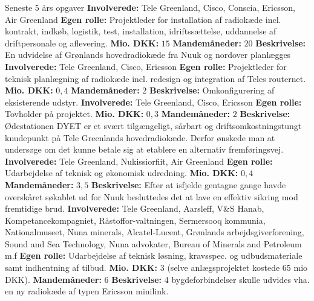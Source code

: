 \begin{rubric}{Seneste 5 års opgaver}
\entry* \textbf{Involverede:} Tele Greenland, Cisco, Conscia, Ericsson, Air Greenland
\entry* \textbf{Egen rolle:} Projektleder for installation af radiokæde incl. kontrakt, indkøb, logistik, test, installation, idriftssættelse, uddannelse af driftpersonale og aflevering.
\entry* \textbf{Mio. DKK:} $15$
\entry* \textbf{Mandemåneder:} $20$
%
 \textbf{Beskrivelse:} En udvidelse af Grønlands hovedradiokæde fra Nuuk og nordover planlægges
\entry* \textbf{Involverede:} Tele Greenland, Cisco, Ericsson
\entry* \textbf{Egen rolle:} Projektleder for teknisk planlægning af radiokæde incl. redesign og integration af Teles routernet.
\entry* \textbf{Mio. DKK:} $0,4$
\entry* \textbf{Mandemåneder:} $2$
%
 \textbf{Beskrivelse:} Omkonfigurering af eksisterende udstyr.
\entry* \textbf{Involverede:} Tele Greenland, Cisco, Ericsson
\entry* \textbf{Egen rolle:} Tovholder på projektet.
\entry* \textbf{Mio. DKK:} $0,3$
\entry* \textbf{Mandemåneder:} $2$
%
 \textbf{Beskrivelse:} Ødestationen DYET er et svært tilgængeligt, sårbart og driftsomkostningstungt knudepunkt på Tele Greenlands hovedradiokæde. Derfor ønskede man at undersøge om det kunne betale sig at etablere en alternativ fremføringsvej.
\entry* \textbf{Involverede:} Tele Greenland, Nukissiorfiit, Air Greenland
\entry* \textbf{Egen rolle:} Udarbejdelse af teknisk og økonomisk udredning.
\entry* \textbf{Mio. DKK:} $0,4$
\entry* \textbf{Mandemåneder:} $3,5$
%
 \textbf{Beskrivelse:} Efter at isfjelde gentagne gange havde overskåret søkablet ud for Nuuk besluttedes det at lave en effektiv sikring mod fremtidige brud.
\entry* \textbf{Involverede:} Tele Greenland, Aarsleff, V\&S Hanab, Kompetancekompagniet, Råstoffor-valtningen, Sermersooq kommunia, Nationalmuseet, Nuna minerals, Alcatel-Lucent, Grønlands arbejdsgiverforening, Sound and Sea Technology, Nuna advokater, Bureau of Minerals and Petroleum m.f
\entry* \textbf{Egen rolle:} Udarbejdelse af teknisk løsning, kravsspec. og udbudsmateriale samt indhentning af tilbud. 
\entry* \textbf{Mio. DKK:} $3$ (selve anlægsprojektet kostede 65 mio DKK).
\entry* \textbf{Mandemåneder:} $6$
%
 \textbf{Beskrivelse:} 4 bygdeforbindelser skulle udvides vha. en ny radiokæde af typen Ericsson minilink.

\end{rubric}
